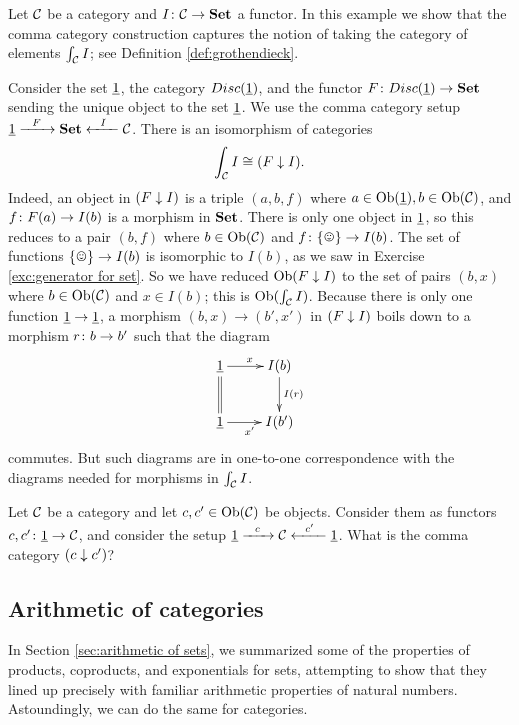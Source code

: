 \begin{example}

Let $\mathcal{C}$ be a category and $I\colon\mathcal{C}\rightarrow{\bf Set}$ a functor. In this example we show that the comma category construction captures the notion of taking the category of elements $\int_\mathcal{C} I$; see Definition \ref{def:grothendieck}. 

Consider the set $\underline{1}$, the category $Disc(\underline{1})$, and the functor $F\colon Disc(\underline{1})\rightarrow{\bf Set}$ sending the unique object to the set $\underline{1}$. We use the comma category setup $\underline{1}\xrightarrow{\ \ F\ \ }{\bf Set}\xleftarrow{\ \ I\ \ }\mathcal{C}$. There is an isomorphism of categories 
$$\int_\mathcal{C} I\cong (F\downarrow I).$$
Indeed, an object in $(F\downarrow I)$ is a triple $(a,b,f)$ where $a\in\textnormal{Ob}(\underline{1}), b\in\textnormal{Ob}(\mathcal{C})$, and $f\colon F(a)\rightarrow I(b)$ is a morphism in ${\bf Set}$. There is only one object in $\underline{1}$, so this reduces to a pair $(b,f)$ where $b\in\textnormal{Ob}(\mathcal{C})$ and $f\taking \singleton\to I(b)$. The set of functions $\singleton\to I(b)$ is isomorphic to $I(b)$, as we saw in Exercise \ref{exc:generator for set}. So we have reduced $\textnormal{Ob}(F\downarrow I)$ to the set of pairs $(b,x)$ where $b\in\textnormal{Ob}(\mathcal{C})$ and $x\in I(b)$; this is $\textnormal{Ob}(\int_\mathcal{C} I)$. Because there is only one function $\underline{1}\rightarrow\underline{1}$, a morphism $(b,x)\to(b',x')$ in $(F\downarrow I)$ boils down to a morphism $r\colon b\rightarrow b'$ such that the diagram 
$$\xymatrix{\ul{1}\ar[r]^x\ar@{=}[d]&I(b)\ar[d]^{I(r)}\\\ul{1}\ar[r]_{x'}&I(b')}$$
commutes. But such diagrams are in one-to-one correspondence with the diagrams needed for morphisms in $\int_\mathcal{C} I$.

\end{example}

\begin{exercise}
Let $\mathcal{C}$ be a category and let $c,c'\in\textnormal{Ob}(\mathcal{C})$ be objects. Consider them as functors $c,c'\colon\underline{1}\rightarrow\mathcal{C}$, and consider the setup $\underline{1}\xrightarrow{\ \ c\ \ }\mathcal{C}\xleftarrow{\ \ c'\ \ }\underline{1}$. What is the comma category $(c\downarrow c')$?
\end{exercise}


\subsection{Arithmetic of categories}\label{sec:arithmetic of categories}

In Section \ref{sec:arithmetic of sets}, we summarized some of the properties of products, coproducts, and exponentials for sets, attempting to show that they lined up precisely with familiar arithmetic properties of natural numbers. Astoundingly, we can do the same for categories.

